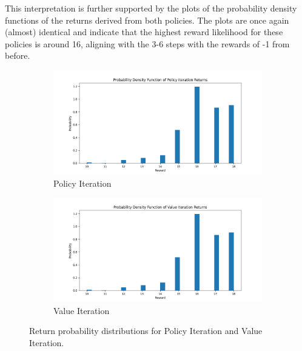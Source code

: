 \documentclass{class}
\begin{document}
\noindent This interpretation is further supported by the plots of the probability density functions of the returns derived from both policies. The plots are once again (almost) identical and indicate that the highest reward likelihood for these policies is around 16, aligning with the 3-6 steps with the rewards of -1 from before.

\begin{figure}[H]
    \centering
    \begin{subfigure}[t]{0.48\linewidth}
        \centering
        \includegraphics[width=\linewidth]{plots/return_probability/policy_iteration_return_probability.png}
        \caption{Policy Iteration}
        \label{fig:policy_iteration_return_probability}
    \end{subfigure}
    \hfill
    \begin{subfigure}[t]{0.48\linewidth}
        \centering
        \includegraphics[width=\linewidth]{plots/return_probability/value_iteration_return_probability.png}
        \caption{Value Iteration}
        \label{fig:value_iterations_return_probability}
    \end{subfigure}
    \caption{Return probability distributions for Policy Iteration and Value Iteration.}
    \label{fig:DP_return_probability_comparison}
\end{figure}
\end{document}
